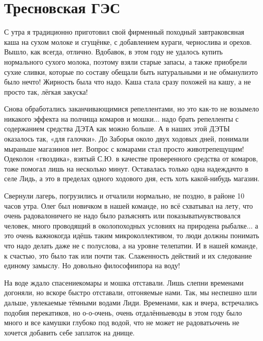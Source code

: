 \chapter{Тресновская ГЭС} 

С утра я традиционно приготовил свой фирменный походный завтрак\mdash овсяная каша на сухом молоке и сгущёнке, с добавлением кураги, чернослива и орехов. Вышло, как всегда, отлично. Вдобавок, в этом году не удалось купить нормального сухого молока, поэтому взяли старые запасы, а также приобрели сухие сливки, которые по составу обещали быть натуральными и не обманули\mdash это было нечто! Жирность была что надо. Каша стала сразу похожей на кашу, а не просто так, лёгкая закуска! 

Снова обработались заканчивающимися репеллентами, но это как-то не возымело никакого эффекта на полчища комаров и мошки$\ldots$ надо брать репелленты с содержанием средства ДЭТА как можно больше. А в наших этой ДЭТЫ оказалось так, «для галочки». До Заборья около двух ходовых дней, понимали мы\mdash раньше магазинов нет. Вопрос с комарами стал просто животрепещущим! Одеколон «гвоздика», взятый С.Ю. в качестве проверенного средства от комаров, тоже помогал лишь на несколько минут. Оставалась только одна надежда\mdash что в селе Лидь, а это в пределах одного ходового дня, есть хоть какой-нибудь магазин.

Свернули лагерь, погрузились и отчалили нормально, не поздно, в районе 10 часов утра. Олег был новичком в нашей команде, но всё схватывал на лету, что очень радовало\mdash ничего не надо было разъяснять или показывать\mdash чувствовался человек, много проводящий в околопоходных условиях на природе\mdash на рыбалке$\ldots$ а это очень важно\mdash когда идёшь таким микроколлективом, то люди должны понимать что надо делать даже не с полуслова, а на уровне телепатии. И в нашей команде, к счастью, это было так или почти так. Слаженность действий и их следование единому замыслу. Но довольно философии\mdash пора на воду!

На воде ждало спасение\mdash комары и мошка отставали. Лишь слепни временами догоняли, но вскоре быстро отставали, отгоняемые нами. Так, мы неспешно шли дальше, увлекаемые тёмными водами Лиди. Временами, как и вчера, встречались подобия перекатиков, но о-о-очень, очень отдалённые\mdash воды в этом году было много и все камушки глубоко под водой, что не может не радовать\mdash очень не хочется добавить себе заплаток на днище. 


